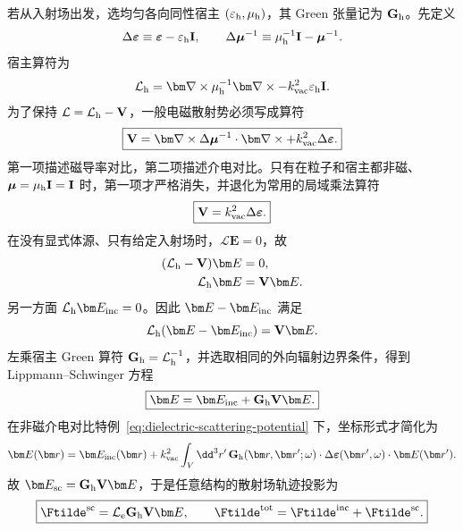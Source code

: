 若从入射场出发，选均匀各向同性宿主 $(\varepsilon_{\rm h},\mu_{\rm h})$，其 Green 张量记为 $\mathbf G_{\rm h}$。先定义
\begin{equation}
 \Delta\boldsymbol\varepsilon
 \equiv\boldsymbol\varepsilon-\varepsilon_{\rm h}\mathbf I,
 \qquad
 \Delta\boldsymbol\mu^{-1}
 \equiv\mu_{\rm h}^{-1}\mathbf I-\boldsymbol\mu^{-1}.
\end{equation}
宿主算符为
\begin{equation}
 \mathcal L_{\rm h}
 =\bm\nabla\times\mu_{\rm h}^{-1}\bm\nabla\times
 -k_{\rm vac}^2\varepsilon_{\rm h}\mathbf I.
\end{equation}
为了保持 $\mathcal L=\mathcal L_{\rm h}-\mathbf V$，一般电磁散射势必须写成算符
\begin{equation}
 \boxed{
 \mathbf V
 =\bm\nabla\times\Delta\boldsymbol\mu^{-1}\cdot\bm\nabla\times
 +k_{\rm vac}^2\Delta\boldsymbol\varepsilon.}
 \label{eq:general-electromagnetic-scattering-potential}
\end{equation}
第一项描述磁导率对比，第二项描述介电对比。只有在粒子和宿主都非磁、$\boldsymbol\mu=\mu_{\rm h}\mathbf I=\mathbf I$ 时，第一项才严格消失，并退化为常用的局域乘法算符
\begin{equation}
 \boxed{\mathbf V=k_{\rm vac}^2\Delta\boldsymbol\varepsilon.}
 \label{eq:dielectric-scattering-potential}
\end{equation}
在没有显式体源、只有给定入射场时，$\mathcal L\bm E=0$，故
\begin{align}
(\mathcal L_{\rm h}-\mathbf V)\bm E&=0,\\
\mathcal L_{\rm h}\bm E&=\mathbf V\bm E.
\end{align}
另一方面 $\mathcal L_{\rm h}\bm E_{\rm inc}=0$。因此 $\bm E-\bm E_{\rm inc}$ 满足
\begin{equation}
\mathcal L_{\rm h}(\bm E-\bm E_{\rm inc})=\mathbf V\bm E.
\end{equation}
左乘宿主 Green 算符 $\mathbf G_{\rm h}=\mathcal L_{\rm h}^{-1}$，并选取相同的外向辐射边界条件，得到 Lippmann--Schwinger 方程
\begin{equation}
\boxed{
\bm E=\bm E_{\rm inc}+\mathbf G_{\rm h}\mathbf V\bm E.}
\label{eq:LS-operator}
\end{equation}
在非磁介电对比特例~\eqref{eq:dielectric-scattering-potential} 下，坐标形式才简化为
\begin{equation}
\bm E(\bm r)=\bm E_{\rm inc}(\bm r)
+k_{\rm vac}^2\int_V\dd^3r'\,
\mathbf G_{\rm h}(\bm r,\bm r';\omega)
\cdot\Delta\boldsymbol\varepsilon(\bm r',\omega)
\cdot\bm E(\bm r').
\label{eq:LS_E}
\end{equation}
故 $\bm E_{\rm sc}=\mathbf G_{\rm h}\mathbf V\bm E$，于是任意结构的散射场轨迹投影为
\begin{equation}
\boxed{
\Ftilde^{\rm sc}=\mathcal L_{\rm e}\mathbf G_{\rm h}\mathbf V\bm E,\qquad
\Ftilde^{\rm tot}=\Ftilde^{\rm inc}+\Ftilde^{\rm sc}.}
\label{eq:general-green-pinem-operator}
\end{equation}


